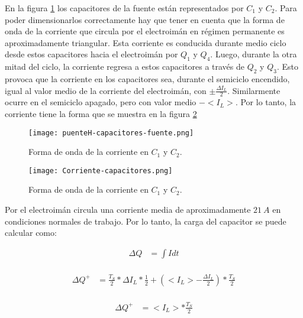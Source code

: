 \noindent En la figura \ref{fig:img_puenteH-capacitores-fuente.png} los capacitores de la fuente están representados por $C_1$ y $C_2$. Para poder dimensionarlos correctamente hay que tener en cuenta que la forma de onda de la corriente que circula por el electroimán en régimen permanente es aproximadamente triangular. Esta corriente es conducida durante medio ciclo desde estos capacitores hacia el electroimán por $Q_1$ y $Q_4$. Luego, durante la otra mitad del ciclo, la corriente regresa a estos capacitores a través de $Q_2$ y $Q_3$. Esto provoca que la corriente en los capacitores sea, durante el semiciclo encendido, igual al valor medio de la corriente del electroimán, con $ \pm \frac{\Delta I_L}{2}$. Similarmente ocurre en el semiciclo apagado, pero con valor medio $-<I_L>$.  Por lo tanto,  la corriente tiene la forma que se muestra en la figura \ref{fig:img_ccorriente-capacitores}

\begin{figure}[H]
	\centering
	\texttt{[image: puenteH-capacitores-fuente.png]}
	\caption{Forma de onda de la corriente en $C_1$ y $C_2$.}
	\label{fig:img_puenteH-capacitores-fuente.png}
\end{figure}

\begin{figure}[H]
	\centering
	\texttt{[image: Corriente-capacitores.png]}
	\caption{Forma de onda de la corriente en $C_1$ y $C_2$.}
	\label{fig:img_ccorriente-capacitores}
\end{figure}

\noindent Por el electroimán circula una corriente media de aproximadamente $21\:A$ en condiciones normales de trabajo. Por lo tanto, la carga del capacitor se puede calcular como:

\begin{equation} 
	\begin{aligned}
		\Delta Q &= \int I dt\\	
	\end{aligned}
\end{equation}

\begin{equation} 
	\begin{aligned}
		\Delta Q ^+ &= \frac{T_S}{2}*\Delta I_L * \frac{1}{2} + (<I_L> -\frac{\Delta I_L}{2})*\frac{T_S}{2}\\
	\end{aligned}
\end{equation}

\begin{equation} 
	\begin{aligned}
		\Delta Q ^+ &= <I_L> *\frac{T_S}{2}\\
	\end{aligned}
\end{equation}

